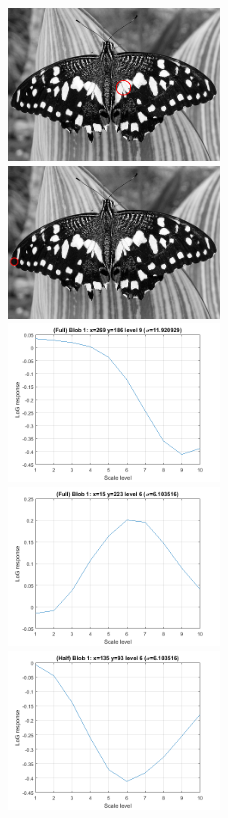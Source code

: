 \documentclass[a4paper,psfig,subfigure,epsfig,fleqn,ausarbeitung,amssmb,float,caption,fontenc]{article}
\begin{document}
\begin{figure}[h]
	\includegraphics[width=0.5\textwidth]{figures/a3_butterfly_keypoint.png}
	\includegraphics[width=0.5\textwidth]{figures/a3_butterfly_keypoint_2.png}
	\includegraphics[width=0.5\textwidth]{figures/a3_butterfly_log_full.png}
	\includegraphics[width=0.5\textwidth]{figures/a3_butterfly_log_full_2.png}
	\includegraphics[width=0.5\textwidth]{figures/a3_butterfly_log_half.png}

\end{figure}
\end{document}
